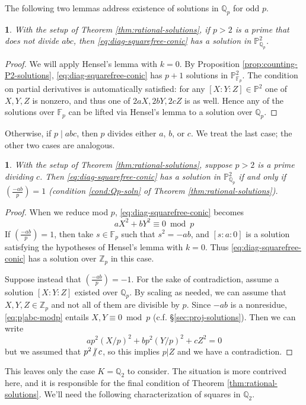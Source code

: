 \documentclass[10pt,a4paper]{amsart}
\numberwithin{equation}{section}
\numberwithin{figure}{section}
\numberwithin{table}{section}
\theoremstyle{definition}
\theoremstyle{plain}
\theoremstyle{remark}
\theoremstyle{plain}
\theoremstyle{definition}
\theoremstyle{plain}
\theoremstyle{plain}
\newtheorem{lem}[thm]{\protect\lemmaname}
\providecommand{\lemmaname}{Lemma}
\newcommand{\legendre}[2]{\genfrac{(}{)}{}{}{#1}{#2}}
\renewcommand{\P}{\mathbb{P}}
\newcommand{\F}{\mathbb{F}}
\newcommand{\Z}{\mathbb{Z}}
\newcommand{\Q}{\mathbb{Q}}
\newcommand{\ndiv}{\centernot|}
\begin{document}
	The following two lemmas address existence of solutions in $\Q_p$ for odd $p$.
	\begin{lem}
		With the setup of Theorem \ref{thm:rational-solutions}, if $p > 2$ is a prime that does not divide $abc$, then \eqref{eq:diag-squarefree-conic} has a solution in $\P^2_{\Q_p}$.
	\end{lem}
	\begin{proof}
		We will apply Hensel's lemma with $k=0$. By Proposition \ref{prop:counting-P2-solutions}, \eqref{eq:diag-squarefree-conic} has $p+1$ solutions in $\P^2_{\F_p}$. The condition on partial derivatives is automatically satisfied: for any $[X:Y:Z]\in \P^2$ one of $X,Y,Z$ is nonzero, and thus one of $2aX, 2bY, 2cZ$ is as well. Hence any of the solutions over $\F_p$ can be lifted via Hensel's lemma to a solution over $\Q_p$.
	\end{proof}
	
	Otherwise, if $p\mid abc$, then $p$ divides either $a$, $b$, or $c$. We treat the last case; the other two cases are analogous.
	
	\begin{lem}
		With the setup of Theorem \ref{thm:rational-solutions}, suppose $p > 2$ is a prime dividing $c$. Then \eqref{eq:diag-squarefree-conic} has a solution in $\P^2_{\Q_p}$ if and only if $\legendre{-ab}{p}=1$ (condition \eqref{cond:Qp-soln} of Theorem \ref{thm:rational-solutions}).
	\end{lem}
	\begin{proof}
		When we reduce mod $p$, \eqref{eq:diag-squarefree-conic} becomes
		\begin{equation}\label{eq:p|abc-modp}
		aX^2 + bY^2 \equiv 0 \bmod p
		\end{equation}
		If $\legendre{-ab}{p}=1$, then take $s\in \F_p$ such that $s^2 = -ab$, and $[s:a:0]$ is a solution satisfying the hypotheses of Hensel's lemma with $k=0$. Thus \eqref{eq:diag-squarefree-conic} has a solution over $\Z_p$ in this case.
		
		Suppose instead that $\legendre{-ab}{p}=-1$. For the sake of contradiction, assume a solution $[X:Y:Z]$ existed over $\Q_p$. By scaling as needed, we can assume that $X,Y,Z\in \Z_p$ and not all of them are divisible by $p$. Since $-ab$ is a nonresidue, \eqref{eq:p|abc-modp} entails $X,Y \equiv 0 \bmod p$ (c.f. \S\ref{sec:proj-solutions}). Then we can write
		\[
		ap^2 (X/p)^2 + bp^2 (Y/p)^2 + cZ^2 = 0
		\]
		but we assumed that $p^2\ndiv c$, so this implies $p|Z$ and we have a contradiction.
	\end{proof}
	This leaves only the case $K = \Q_2$ to consider. The situation is more contrived here,
	and it is responsible for the final condition of Theorem 
	\ref{thm:rational-solutions}. We'll need the following characterization of squares
	in $\Q_2$.
	
\end{document}
